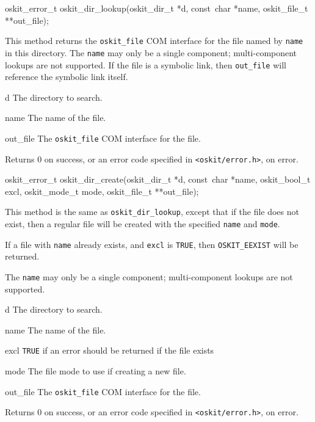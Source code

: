 \begin{apisyn}

	\funcproto oskit_error_t
	oskit_dir_lookup(oskit_dir_t *d, const~char *name, 
			\outparam oskit_file_t **out_file); 
\end{apisyn}
\ostofs
\begin{apidesc}
	This method returns the {\tt oskit_file} COM interface
	for the file named by {\tt name} in this directory.
	The {\tt name} may only be a single component;
	multi-component lookups are not supported.
	If the file is a symbolic link, then {\tt out_file}
	will reference the symbolic link itself.
\end{apidesc}
\begin{apiparm}
	\item[d]
		The directory to search.
	\item[name]
		The name of the file.
	\item[out_file]
		The {\tt oskit_file} COM interface for the file.
\end{apiparm}
\begin{apiret}
	Returns 0 on success, or an error code specified in
	{\tt <oskit/error.h>}, on error.
\end{apiret}


\begin{apisyn}

	\funcproto oskit_error_t
	oskit_dir_create(oskit_dir_t *d, const~char *name, 
			oskit_bool_t excl, oskit_mode_t mode,
			\outparam oskit_file_t **out_file); 
\end{apisyn}
\ostofs
\begin{apidesc}
	This method is the same as {\tt oskit_dir_lookup}, except
	that if the file does not exist, then a regular file
	will be created with the specified {\tt name} and
	{\tt mode}.

	If a file with {\tt name} already exists, and 	
	{\tt excl} is {\tt TRUE}, then {\tt OSKIT_EEXIST} will be
	returned.

	The {\tt name} may only be a single component;
	multi-component lookups are not supported.
\end{apidesc}
\begin{apiparm}
	\item[d]
		The directory to search.
	\item[name]
		The name of the file.
	\item[excl]
		{\tt TRUE} if an error should be returned if the file exists
	\item[mode]
		The file mode to use if creating a new file.
	\item[out_file]
		The {\tt oskit_file} COM interface for the file.
\end{apiparm}
\begin{apiret}
	Returns 0 on success, or an error code specified in
	{\tt <oskit/error.h>}, on error.
\end{apiret}


